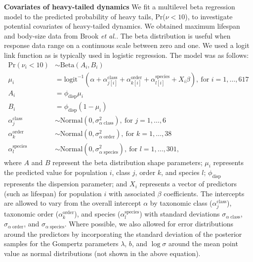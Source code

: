 \textbf{Covariates of heavy-tailed dynamics} We fit a multilevel beta regression model to the predicted probability of heavy tails, Pr(\(\nu < 10\)), to investigate potential covariates of heavy-tailed dynamics. We obtained maximum lifespan and body-size data from Brook \emph{et al.}\cite{brook2006a}. The beta distribution is useful when response data range on a continuous scale between zero and one\cite{ferrari2004}. We used a logit link function as is typically used in logistic regression. The model was as follows:
\begin{align}
\mathrm{Pr}(\nu_i < 10) &\sim \mathrm{Beta}(A_i, B_i)\\
\mu_i &= \mathrm{logit}^{-1}(\alpha
  + \alpha^\mathrm{class}_{j[i]}
  + \alpha^\mathrm{order}_{k[i]}
  + \alpha^\mathrm{species}_{l[i]}
  + X_i \beta),
  \: \text{for } i = 1, \dots, 617\\
A_i &= \phi_\mathrm{disp} \mu_i\\
B_i &= \phi_\mathrm{disp} (1 - \mu_i)\\
\alpha^\mathrm{class}_j &\sim
  \mathrm{Normal}(0, \sigma^2_{\alpha \; \mathrm{class}}),
  \: \text{for } j = 1, \dots, 6\\
\alpha^\mathrm{order}_k &\sim
  \mathrm{Normal}(0, \sigma^2_{\alpha \; \mathrm{order}}),
  \: \text{for } k = 1, \dots, 38\\
\alpha^\mathrm{species}_l &\sim
  \mathrm{Normal}(0, \sigma^2_{\alpha \; \mathrm{species}}),
  \: \text{for } l = 1, \dots, 301,
\end{align}
where \(A\) and \(B\) represent the beta distribution shape parameters; \(\mu_i\) represents the predicted value for population \(i\), class \(j\), order \(k\), and species \(l\); \(\phi_\mathrm{disp}\) represents the dispersion parameter; and \(X_i\) represents a vector of predictors (such as lifespan) for population \(i\) with associated \(\beta\) coefficients. The intercepts are allowed to vary from the overall intercept \(\alpha\) by taxonomic class (\(\alpha^\mathrm{class}_j\)), taxonomic order (\(\alpha^\mathrm{order}_k\)), and species (\(\alpha^\mathrm{species}_l\)) with standard deviations \(\sigma_{\alpha \; \mathrm{class}}\), \(\sigma_{\alpha \; \mathrm{order}}\), and \(\sigma_{\alpha \; \mathrm{species}}\). Where possible, we also allowed for error distributions around the predictors by incorporating the standard deviation of the posterior samples for the Gompertz parameters \(\lambda\), \(b\), and \(\log \sigma\) around the mean point value as normal distributions (not shown in the above equation).

